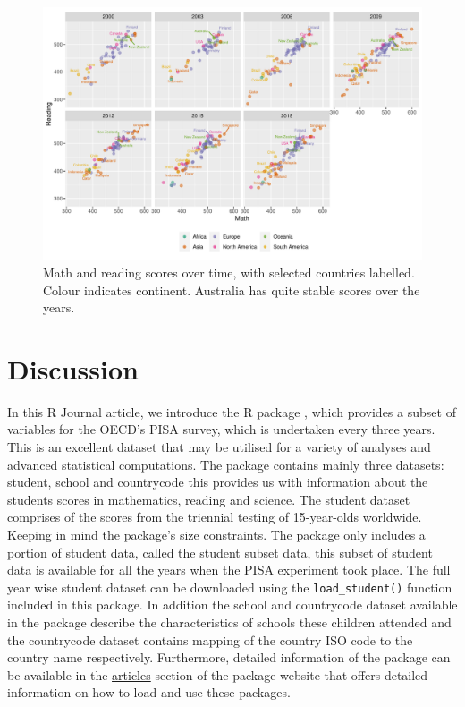 \begin{Schunk}
\begin{figure}
\includegraphics[width=1\linewidth]{learningtower_files/figure-latex/facet-time-1} \caption[Math and reading scores over time, with selected countries labelled]{Math and reading scores over time, with selected countries labelled. Colour indicates continent. Australia has quite stable scores over the years.}\label{fig:facet-time}
\end{figure}
\end{Schunk}

\hypertarget{discussion}{%
\section{Discussion}\label{discussion}}

In this R Journal article, we introduce the R package
, which provides a subset of variables for the
OECD's PISA survey, which is undertaken every three years. This is an
excellent dataset that may be utilised for a variety of analyses and
advanced statistical computations. The package contains mainly three
datasets: student, school and countrycode this provides us with
information about the students scores in mathematics, reading and
science. The student dataset comprises of the scores from the triennial
testing of 15-year-olds worldwide. Keeping in mind the package's size
constraints. The package only includes a portion of student data, called
the student subset data, this subset of student data is available for
all the years when the PISA experiment took place. The full year wise
student dataset can be downloaded using the \texttt{load\_student()}
function included in this package. In addition the school and
countrycode dataset available in the package describe the
characteristics of schools these children attended and the countrycode
dataset contains mapping of the country ISO code to the country name
respectively. Furthermore, detailed information of the
 package can be available in the
\href{https://kevinwang09.github.io/learningtower/articles/learningtower_school.html}{articles}
section of the package website that offers detailed information on how
to load and use these packages.

